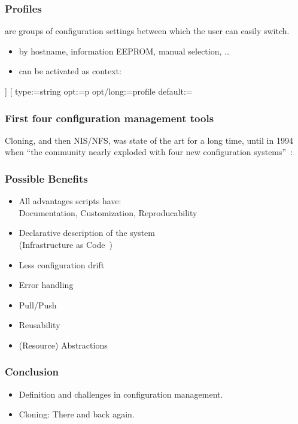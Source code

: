 \begin{frame}[fragile]
	\frametitle{Profiles}

	 are groups of configuration settings between which the user can easily switch.

	\begin{itemize}
	\item by hostname, information EEPROM, manual selection, \dots
	\item can be activated as context:
	\end{itemize}

	\begin{code}[morekeywords={long},gobble=4]]
	[%
	  type:=string
	  opt:=p
	  opt/long:=profile
	  default:=
	\end{code}
\end{frame}


\begin{frame}
	\frametitle{First four configuration management tools}
	Cloning, and then NIS/NFS, was state of the art for a long time, until in 1994 when \enquote{the community nearly exploded with four new configuration systems}~\cite{evard1997analysis}:

\end{frame}

\begin{frame}
	\frametitle{Possible Benefits}

	\begin{itemize}[<+-| alert@+>]
	\item All advantages scripts have: \\
		Documentation, Customization, Reproducability
	\item Declarative description of the system \\
		(Infrastructure as Code~\cite{waldemar2013testing})
	\item Less configuration drift
	\item Error handling
	\item Pull/Push
	\item Reusability
	\item (Resource) Abstractions
	\end{itemize}
\end{frame}

\begin{frame}
	\frametitle{Conclusion}

	\begin{itemize}[<+-| alert@+>]
	\item Definition and challenges in configuration management.
	\item Cloning: There and back again.
	\end{itemize}
\end{frame}



